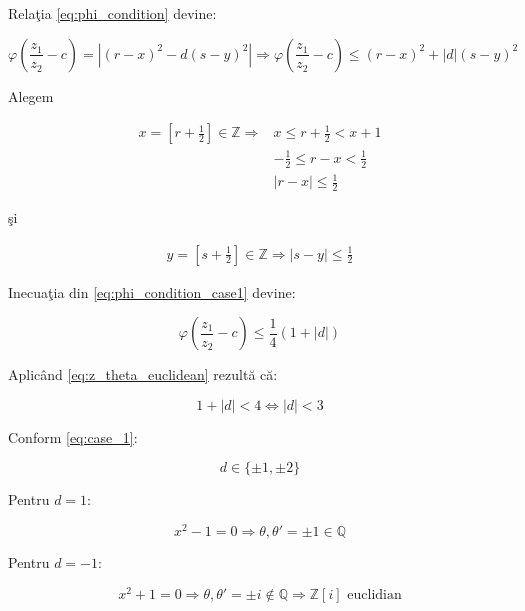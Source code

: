 \documentclass[12pt]{article}
\begin{document}
Relaţia \eqref{eq:phi_condition} devine:

\begin{equation} \label{eq:phi_condition_case1}
    \varphi \left(\frac{z_1}{z_2} - c\right)  = \left| (r-x)^2 - d(s-y)^2 \right| 
   \Rightarrow \varphi \left(\frac{z_1}{z_2} - c\right) \leq (r-x)^2 + |d|(s-y)^2
\end{equation}

Alegem

\begin{equation}
\begin{split}
    x = \left[ r + \frac{1}{2} \right] \in \mathbb{Z} \Rightarrow & x \leq r + \frac{1}{2} < x + 1 \\
    & -\frac{1}{2} \leq r - x < \frac{1}{2} \\
    & \boxed{|r - x| \leq \frac{1}{2}}
\end{split}
\end{equation}

şi

\begin{equation}
\begin{split}
    y = \left[ s + \frac{1}{2} \right] \in \mathbb{Z} \Rightarrow \boxed{|s - y| \leq \frac{1}{2}}
\end{split}
\end{equation}

Inecuaţia din \eqref{eq:phi_condition_case1} devine:

\begin{equation}
    \varphi \left(\frac{z_1}{z_2} - c\right) \leq \frac{1}{4}(1 + |d|)
\end{equation}

Aplicând \eqref{eq:z_theta_euclidean} rezultă că:

\begin{equation}
    1 + |d| < 4 \Leftrightarrow |d| < 3
\end{equation}

Conform \eqref{eq:case_1}:

\begin{equation*}
    d \in \{\pm 1, \pm 2\}
\end{equation*}

Pentru $d = 1$:

\begin{equation*}
    x^2 - 1 = 0 \Rightarrow \theta, \theta' = \pm 1 \in \mathbb{Q}
\end{equation*}

Pentru $d = -1$:

\begin{equation}
    x^2 + 1 = 0 \Rightarrow \theta, \theta' = \pm i \notin \mathbb{Q} \Rightarrow \boxed{\mathbb{Z}[i] \text{ euclidian}}
\end{equation}
\end{document}
